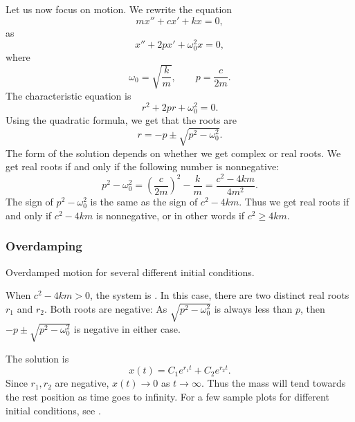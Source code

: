 Let us now focus on  motion.  We rewrite the equation
\begin{equation*}
m x'' + c x' + kx = 0,
\end{equation*}
as
\begin{equation*}
x'' + 2p x' + \omega_0^2 x = 0,
\end{equation*}
where
\begin{equation*}
\omega_0 = \sqrt{\frac{k}{m}}, \qquad p = \frac{c}{2m} .
\end{equation*}
The characteristic equation is
\begin{equation*}
r^2 + 2 pr + \omega_0^2 = 0 .
\end{equation*}
Using the quadratic formula, we get that the roots are
\begin{equation*}
r = -p \pm \sqrt{p^2 - \omega_0^2} .
\end{equation*}
The form of the solution depends on whether we get complex or real roots.
We get real roots if and only if the following number is nonnegative:
\begin{equation*}
p^2 - \omega_0^2 = {\left( \frac{c}{2m} \right)}^2 - \frac{k}{m}
= \frac{c^2 - 4km}{4m^2} .
\end{equation*}
The sign of $p^2-\omega_0^2$ is the same as the sign of
$c^2 - 4km$.  Thus we get real roots if and only if $c^2-4km$ is
nonnegative, or in other words if $c^2 \geq 4km$.

\subsubsection{Overdamping}

\begin{mywrapfig}[15]{3.25in}
\capstart
{}
\caption{Overdamped motion for several different initial conditions.\label{mv:overdampedfig}}
\end{mywrapfig}
%
%

When
$c^2 - 4km > 0$, the system is \emph{}.  In this case,
there are two distinct real roots $r_1$ and $r_2$.  Both roots are
negative:  As $\sqrt{p^2 - \omega_0^2}$ is always less than $p$,
then
$-p \pm \sqrt{p^2 - \omega_0^2}$ is negative in either case.


The solution is
\begin{equation*}
x(t) = C_1 e^{r_1 t} + C_2 e^{r_2 t} .
\end{equation*}
Since $r_1, r_2$ are negative, $x(t) \to 0$ as $t \to \infty$.
Thus the mass will tend towards the rest position as
time goes to infinity.  For a few sample plots for different initial
conditions, see .

